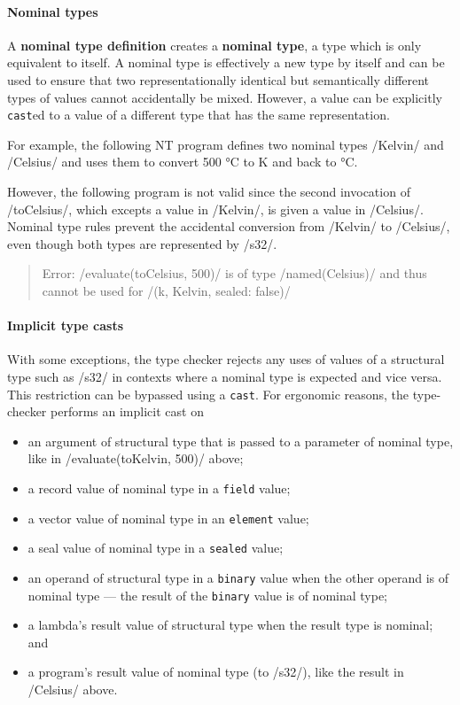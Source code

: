 \documentclass[main.tex]{subfiles}
\begin{document}
\paragraph{Nominal types} A \textbf{nominal type definition} creates a \textbf{nominal type}, a type which is only equivalent to itself. A nominal type is effectively a new type by itself and can be used to ensure that two representationally identical but semantically different types of values cannot accidentally be mixed. However, a value can be explicitly \texttt{cast}ed to a value of a different type that has the same representation.

For example, the following NT program defines two nominal types \iil/Kelvin/ and \iil/Celsius/ and uses them to convert 500 °C to K and back to °C.

However, the following program is not valid since the second invocation of \iil/toCelsius/, which excepts a value in \iil/Kelvin/, is given a value in \iil/Celsius/. Nominal type rules prevent the accidental conversion from \iil/Kelvin/ to \iil/Celsius/, even though both types are represented by \iil/s32/.

\begin{quote}
	\ttfamily\footnotesize
	Error: \iil/evaluate(toCelsius, 500)/ is of type \iil/named(Celsius)/ and thus cannot be used for \iil/(k, Kelvin, sealed: false)/
\end{quote}

\paragraph{Implicit type casts} With some exceptions, the type checker rejects any uses of values of a structural type such as \iil/s32/ in contexts where a nominal type is expected and vice versa. This restriction can be bypassed using a \texttt{cast}. For ergonomic reasons, the type-checker performs an implicit cast on
\begin{itemize}[nosep]
	\item an argument of structural type that is passed to a parameter of nominal type, like in \iil/evaluate(toKelvin, 500)/ above;
	\item a record value of nominal type in a \texttt{field} value;
	\item a vector value of nominal type in an \texttt{element} value;
	\item a seal value of nominal type in a \texttt{sealed} value;
	\item an operand of structural type in a \texttt{binary} value when the other operand is of nominal type — the result of the \texttt{binary} value is of nominal type;
	\item a lambda's result value of structural type when the result type is nominal; and
	\item a program's result value of nominal type (to \iil/s32/), like the result in \iil/Celsius/ above.
\end{itemize}
\end{document}
